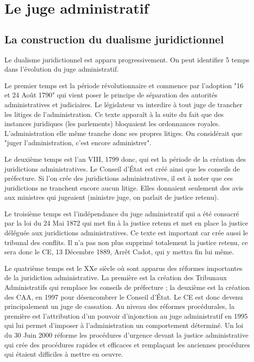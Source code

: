 \documentclass[10pt, a4paper, openany]{book}
\begin{document}
\section{Le juge administratif}

\subsection{La construction du dualisme juridictionnel}

Le dualisme juridictionnel est apparu progressivement. On peut identifier 5 temps dans l'évolution du juge administratif.


Le premier temps est la période révolutionnaire et commence par l'adoption "16 et 24 Août 1790" qui vient poser le principe de séparation des autorités administratives et judiciaires. Le législateur va interdire à tout juge de trancher les litiges de l'administration. Ce texte apparaît à la suite du fait que des instances juridiques (les parlements) bloquaient les ordonnances royales. L'administration elle même tranche donc ses propres litiges. On considérait que "juger l'administration, c'est encore administrer".


Le deuxième temps est l'an VIII, 1799 donc, qui est la période de la création des juridictions administratives. Le Conseil d'État est créé ainsi que les conseils de préfecture. Si l'on crée des juridictions administratives, il est à noter que ces juridictions ne tranchent encore aucun litige. Elles donnaient seulement des avis aux ministres qui jugeaient (ministre juge, on parlait de justice retenu).


Le troisième temps est l'indépendance du juge administratif qui a été consacré par la loi du 24 Mai 1872 qui met fin à la justice retenu et met en place la justice déléguée aux juridictions administratives. Ce texte est important car crée aussi le tribunal des conflits. Il n'a pas non plus supprimé totalement la justice retenu, ce sera donc le CE, 13 Décembre 1889, Arrêt Cadot, qui y mettra fin lui même. 


Le quatrième temps est le XXe siècle où sont apparus des réformes importantes de la juridiction administrative. La première est la création des Tribunaux Administratifs qui remplace les conseils de préfecture ; la deuxième est la création des CAA, en 1997 pour désencombrer le Conseil d'État. Le CE est donc devenu principalement un juge de cassation. Au niveau des réformes procédurales, la première est l'attribution d'un pouvoir d'injonction au juge administratif en 1995 qui lui permet d'imposer à l'administration un comportement déterminé. Un loi du 30 Juin 2000 réforme les procédures d'urgence devant la justice administrative qui crée des procédures rapides et efficaces et remplaçant les anciennes procédures qui étaient difficiles à mettre en oeuvre.
\end{document}
